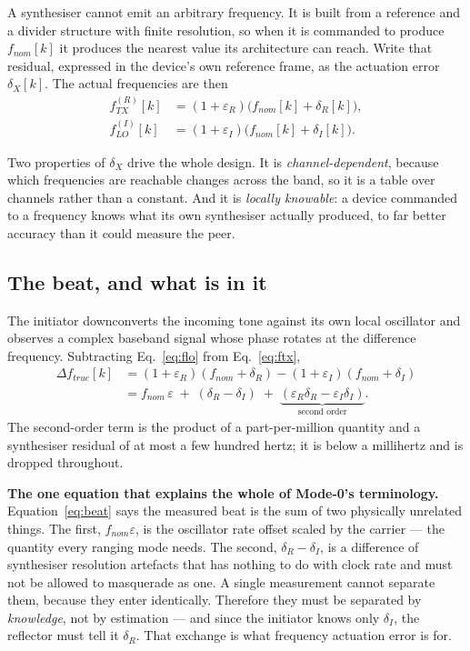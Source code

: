\documentclass[11pt,a4paper]{article}
\begin{document}
A synthesiser cannot emit an arbitrary frequency. It is built from a reference and a divider
structure with finite resolution, so when it is commanded to produce $f_{nom}[k]$ it produces the
nearest value its architecture can reach. Write that residual, expressed in the device's own
reference frame, as the actuation error $\delta_X[k]$. The actual frequencies are then
\begin{align}
f_{TX}^{(R)}[k] &= (1+\varepsilon_R)\bigl(f_{nom}[k] + \delta_R[k]\bigr), \label{eq:ftx}\\
f_{LO}^{(I)}[k] &= (1+\varepsilon_I)\bigl(f_{nom}[k] + \delta_I[k]\bigr). \label{eq:flo}
\end{align}

Two properties of $\delta_X$ drive the whole design. It is \emph{channel-dependent}, because which
frequencies are reachable changes across the band, so it is a table over channels rather than a
constant. And it is \emph{locally knowable}: a device commanded to a frequency knows what its own
synthesiser actually produced, to far better accuracy than it could measure the peer.

\subsection{The beat, and what is in it}

The initiator downconverts the incoming tone against its own local oscillator and observes a complex
baseband signal whose phase rotates at the difference frequency. Subtracting
Eq.~\eqref{eq:flo} from Eq.~\eqref{eq:ftx},
\begin{align}
\Delta f_{true}[k]
 &= (1+\varepsilon_R)(f_{nom}+\delta_R) - (1+\varepsilon_I)(f_{nom}+\delta_I) \nonumber\\
 &= f_{nom}\,\varepsilon \;+\; (\delta_R-\delta_I) \;+\;
    \underbrace{(\varepsilon_R\delta_R - \varepsilon_I\delta_I)}_{\textstyle \text{second order}} .
\label{eq:beat}
\end{align}
The second-order term is the product of a part-per-million quantity and a synthesiser residual of at
most a few hundred hertz; it is below a millihertz and is dropped throughout.

\begin{callout}
\textbf{The one equation that explains the whole of Mode-0's terminology.} Equation~\eqref{eq:beat}
says the measured beat is the sum of two physically unrelated things. The first,
$f_{nom}\varepsilon$, is the oscillator rate offset scaled by the carrier --- the quantity every
ranging mode needs. The second, $\delta_R-\delta_I$, is a difference of synthesiser resolution
artefacts that has nothing to do with clock rate and must not be allowed to masquerade as one. A
single measurement cannot separate them, because they enter identically. Therefore they must be
separated by \emph{knowledge}, not by estimation --- and since the initiator knows only $\delta_I$,
the reflector must tell it $\delta_R$. That exchange is what frequency actuation error is for.
\end{callout}
\end{document}
